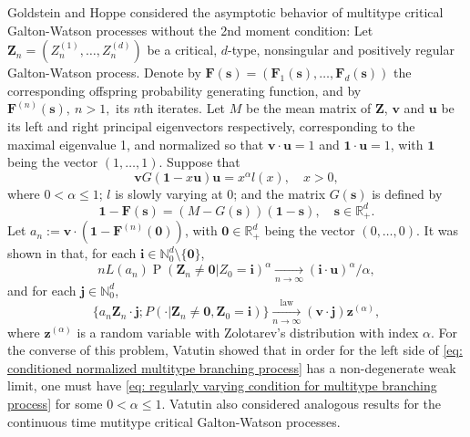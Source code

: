 \documentclass[12pt, a4paper]{amsart}
\theoremstyle{definition}
\numberwithin{equation}{section}
\begin{document}
	Goldstein and Hoppe \cite{GoldsteinHoppe1978Critical} considered the asymptotic behavior of multitype critical Galton-Watson processes without the 2nd moment condition:
	Let $\mathbf Z_n=(Z_n^{(1)}, \dots, Z_n^{(d)})$ be a critical, $d$-type, nonsingular and positively regular Galton-Watson process.
	 Denote by $\mathbf F(\mathbf s) = (\mathbf F_1(\mathbf s), \dots, \mathbf F_d(\mathbf s))$ the corresponding offspring probability generating function,
	and  by $\mathbf F^{(n)}(\mathbf s), ~ n>1,$ its $n$th iterates.
	Let $M$ be the mean matrix of $\mathbf Z$, $\mathbf v$ and $\mathbf u$ be its left and right principal  eigenvectors respectively, corresponding to the maximal eigenvalue 1, and normalized so that $\mathbf v \cdot \mathbf u = 1$ and $\mathbf 1 \cdot \mathbf u = 1$, with $\mathbf 1$ being the vector $(1,\dots, 1)$.
	Suppose that
\[\label{eq: regularly varying condition for multitype branching process}
	\mathbf v G(\mathbf 1-x\mathbf u) \mathbf u
	= x^\alpha l(x),
	\quad x > 0,
\]
	where $0 < \alpha \leq 1$; $l$ is slowly varying at $0$; and
	the matrix $G(\mathbf s)$ is defined by
\[
	\mathbf 1 - \mathbf F(\mathbf s)
	= (M - G(\mathbf s))(\mathbf 1 - \mathbf s),
	\quad \mathbf s \in \mathbb R_+^d.
\]
    Let
    $a_n := \mathbf v \cdot (\mathbf 1 - \mathbf F^{(n)}(\mathbf 0))$,
    with $\mathbf 0 \in \mathbb R_+^d$ being the vector $(0,\dots, 0)$.
It was shown in \cite{GoldsteinHoppe1978Critical} that,
 for each $\mathbf i \in \mathbb N_0^d \setminus \{\mathbf 0\}$,
\[ \label{eq: limit behavior of the exitinction probability without finite variance of multitype branching processes}
	n L(a_n) \operatorname{P}(\mathbf Z_n \neq \mathbf 0| Z_0 = \mathbf i)^\alpha
	\xrightarrow[n\to \infty]{} (\mathbf i \cdot \mathbf u)^\alpha / \alpha,
\]
	and for each $\mathbf j \in \mathbb N_0^d$,
\[\label{eq: conditioned normalized multitype branching process}
	\{ a_n \mathbf Z_n \cdot \mathbf j ; P(\cdot | \mathbf Z_n \neq \mathbf 0, \mathbf Z_0 = \mathbf i)\}
	\xrightarrow[n\to \infty]{\operatorname{law}} (\mathbf v\cdot \mathbf j) \mathbf z^{(\alpha)},
\]
  where $\mathbf z^{(\alpha)}$ is a random variable with  Zolotarev's distribution with index  $\alpha$.
	For the converse of this problem, Vatutin \cite{Vatutin1977Limit} showed that in order for the left side of \eqref{eq: conditioned normalized multitype branching process} has a non-degenerate weak limit, one must have \eqref{eq: regularly varying condition for multitype branching process} for some $0 < \alpha \leq 1$.
	Vatutin \cite{Vatutin1977Limit} also considered analogous results for the continuous time mutitype critical Galton-Watson processes.
	
\end{document}
